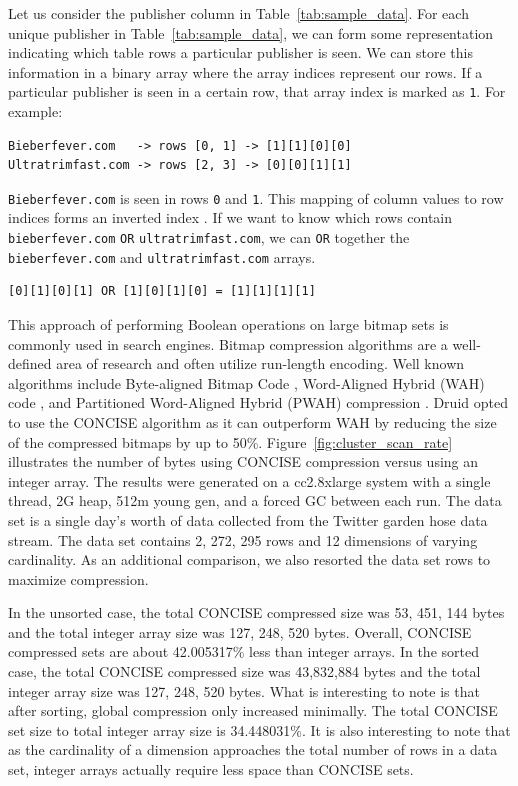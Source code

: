 \documentclass{vldb}
\begin{document}
Let us consider the publisher column in
Table~\ref{tab:sample_data}. For each unique publisher in
Table~\ref{tab:sample_data}, we can form some representation
indicating which table rows a particular publisher is seen. We can
store this information in a binary array where the array indices
represent our rows. If a particular publisher is seen in a certain
row, that array index is marked as \texttt{1}. For example:
\begin{verbatim}
Bieberfever.com   -> rows [0, 1] -> [1][1][0][0]
Ultratrimfast.com -> rows [2, 3] -> [0][0][1][1]
\end{verbatim}

\texttt{Bieberfever.com} is seen in rows \texttt{0} and \texttt{1}. This mapping of column values
to row indices forms an inverted index \cite{tomasic1993performance}. If we want to know which
rows contain \texttt{bieberfever.com} \texttt{OR} \texttt{ultratrimfast.com}, we can \texttt{OR} together
the \texttt{bieberfever.com} and \texttt{ultratrimfast.com} arrays.
\begin{verbatim}
[0][1][0][1] OR [1][0][1][0] = [1][1][1][1]
\end{verbatim}

This approach of performing Boolean operations on large bitmap sets is
commonly used in search engines. Bitmap compression algorithms are a
well-defined area of research and often utilize run-length
encoding. Well known algorithms include Byte-aligned Bitmap Code \cite{antoshenkov1995byte},
Word-Aligned Hybrid (WAH) code \cite{wu2006optimizing}, and Partitioned Word-Aligned
Hybrid (PWAH) compression \cite{van2011memory}. Druid opted to use the CONCISE
algorithm \cite{colantonio2010concise} as it can outperform WAH by reducing the size of the
compressed bitmaps by up to 50\%.  Figure~\ref{fig:cluster_scan_rate} illustrates the number of
bytes using CONCISE compression versus using an integer array. The
results were generated on a cc2.8xlarge system with a single thread,
2G heap, 512m young gen, and a forced GC between each run. The data
set is a single day’s worth of data collected from the Twitter garden
hose \cite{twitter2013} data stream. The data set contains 2, 272, 295 rows and 12
dimensions of varying cardinality. As an additional comparison, we
also resorted the data set rows to maximize compression.

In the unsorted case, the total CONCISE compressed size was 53, 451,
144 bytes and the total integer array size was 127, 248, 520
bytes. Overall, CONCISE compressed sets are about 42.005317\% less
than integer arrays.  In the sorted case, the total CONCISE compressed
size was 43,832,884 bytes and the total integer array size was 127,
248, 520 bytes. What is interesting to note is that after sorting,
global compression only increased minimally. The total CONCISE set
size to total integer array size is 34.448031\%. It is also
interesting to note that as the cardinality of a dimension approaches
the total number of rows in a data set, integer arrays actually
require less space than CONCISE sets.
\end{document}
